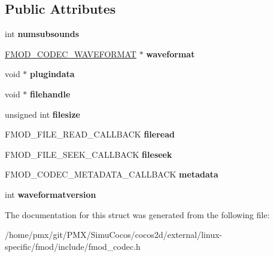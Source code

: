 \subsection*{Public Attributes}
\begin{DoxyCompactItemize}
\item 
\mbox{\label{structFMOD__CODEC__STATE_af9c17a02d9b967fa0ececf991a654dfd}} 
int {\bfseries numsubsounds}
\item 
\mbox{\label{structFMOD__CODEC__STATE_a1223e11dd3ec5e655a88dabd2b8a5b84}} 
\hyperlink{structFMOD__CODEC__WAVEFORMAT}{F\+M\+O\+D\+\_\+\+C\+O\+D\+E\+C\+\_\+\+W\+A\+V\+E\+F\+O\+R\+M\+AT} $\ast$ {\bfseries waveformat}
\item 
\mbox{\label{structFMOD__CODEC__STATE_af92634f543fe55d632f6b4cd325489ce}} 
void $\ast$ {\bfseries plugindata}
\item 
\mbox{\label{structFMOD__CODEC__STATE_a94206a915eec3e91f5ffc61b6d3f1681}} 
void $\ast$ {\bfseries filehandle}
\item 
\mbox{\label{structFMOD__CODEC__STATE_af314546d98e746687bfeaae8a59f792c}} 
unsigned int {\bfseries filesize}
\item 
\mbox{\label{structFMOD__CODEC__STATE_a938fd270ea867d6c29c406381793ee6d}} 
F\+M\+O\+D\+\_\+\+F\+I\+L\+E\+\_\+\+R\+E\+A\+D\+\_\+\+C\+A\+L\+L\+B\+A\+CK {\bfseries fileread}
\item 
\mbox{\label{structFMOD__CODEC__STATE_a3c814d627ae700dbd21bd626d663f73e}} 
F\+M\+O\+D\+\_\+\+F\+I\+L\+E\+\_\+\+S\+E\+E\+K\+\_\+\+C\+A\+L\+L\+B\+A\+CK {\bfseries fileseek}
\item 
\mbox{\label{structFMOD__CODEC__STATE_a0724fc5682690a32814d3301aef59810}} 
F\+M\+O\+D\+\_\+\+C\+O\+D\+E\+C\+\_\+\+M\+E\+T\+A\+D\+A\+T\+A\+\_\+\+C\+A\+L\+L\+B\+A\+CK {\bfseries metadata}
\item 
\mbox{\label{structFMOD__CODEC__STATE_aaabe04329018e5e8d98c7a15c523df8b}} 
int {\bfseries waveformatversion}
\end{DoxyCompactItemize}


The documentation for this struct was generated from the following file\+:\begin{DoxyCompactItemize}
\item 
/home/pmx/git/\+P\+M\+X/\+Simu\+Cocos/cocos2d/external/linux-\/specific/fmod/include/fmod\+\_\+codec.\+h\end{DoxyCompactItemize}
